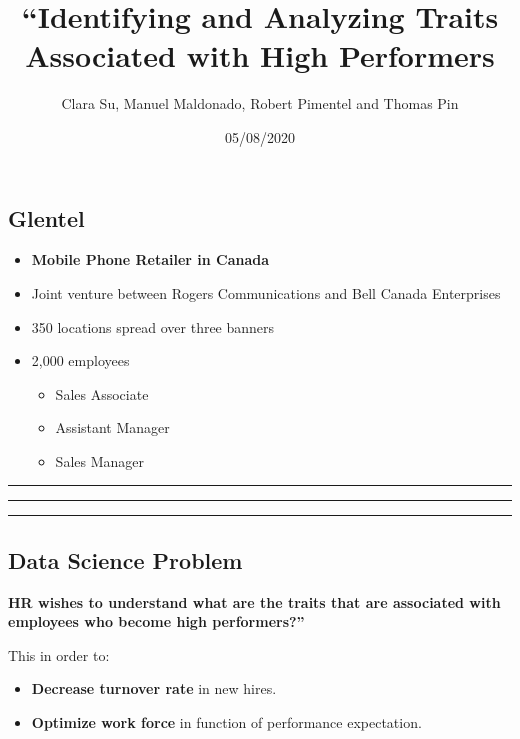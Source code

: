 \documentclass[
]{article}
\title{``Identifying and Analyzing Traits Associated with High Performers}
\author{Clara Su, Manuel Maldonado, Robert Pimentel and Thomas Pin}
\date{05/08/2020}
\providecommand{\tightlist}{%
  \setlength{\itemsep}{0pt}\setlength{\parskip}{0pt}}
\begin{document}
\maketitle

\hypertarget{glentel}{%
\subsection{Glentel}\label{glentel}}

\begin{itemize}
\tightlist
\item
  \textbf{Mobile Phone Retailer in Canada}
\item
  Joint venture between Rogers Communications and Bell Canada
  Enterprises
\item
  350 locations spread over three banners
\item
  2,000 employees

  \begin{itemize}
  \tightlist
  \item
    Sales Associate
  \item
    Assistant Manager
  \item
    Sales Manager
  \end{itemize}
\end{itemize}

\begin{center}\rule{0.5\linewidth}{0.5pt}\end{center}

\begin{center}\rule{0.5\linewidth}{0.5pt}\end{center}

\begin{center}\rule{0.5\linewidth}{0.5pt}\end{center}

\hypertarget{data-science-problem}{%
\subsection{Data Science Problem}\label{data-science-problem}}

\textbf{HR wishes to understand what are the traits that are associated
with employees who become high performers?''}

This in order to:

\begin{itemize}
\tightlist
\item
  \textbf{Decrease turnover rate} in new hires.
\item
  \textbf{Optimize work force} in function of performance expectation.
\end{itemize}
\end{document}
